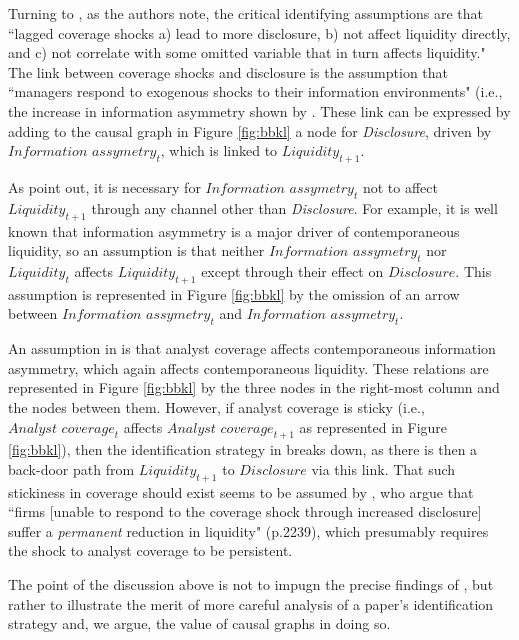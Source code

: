 \documentclass[11pt]{amsart}
\begin{document}
Turning to \citet{Balakrishnan:2014js}, as the authors note, the critical identifying assumptions are that ``lagged coverage shocks a) lead to more disclosure, b) not affect liquidity directly, and c) not correlate with some omitted variable that in turn affects liquidity." 
The link between coverage shocks and disclosure is the assumption that ``managers respond to exogenous shocks to their information environments" (i.e., the increase in information asymmetry shown by  \citet{Kelly:2012ih}.
These link can be expressed by adding to the causal graph in Figure \ref{fig:bbkl} a node for \textit{Disclosure}, driven by $\textit{Information assymetry}_t$, which is linked to $\textit{Liquidity}_{t+1}$.

As \citet{Balakrishnan:2014js} point out, it is necessary for $\textit{Information assymetry}_t$ not to affect $\textit{Liquidity}_{t+1}$ through any channel other than \textit{Disclosure}.
For example, it is well known that information asymmetry is a major driver of contemporaneous liquidity, so an assumption is that neither $\textit{Information assymetry}_t$ nor $\textit{Liquidity}_t$ affects $\textit{Liquidity}_{t+1}$ except through their effect on $\textit{Disclosure}$. 
This assumption is represented in Figure \ref{fig:bbkl} by the omission of an arrow between $\textit{Information assymetry}_t$ and $\textit{Information assymetry}_t$.

An assumption in \citet{Kelly:2012ih} is that analyst coverage affects contemporaneous information asymmetry, which again affects contemporaneous liquidity.
These relations are represented in Figure \ref{fig:bbkl} by the three nodes in the right-most column and the nodes between them.
However, if analyst coverage is sticky (i.e., $\textit{Analyst coverage}_t$ affects $\textit{Analyst coverage}_{t+1}$ as represented in Figure \ref{fig:bbkl}), then the identification strategy in \citet{Balakrishnan:2014js} breaks down, as there is then a back-door path from $\textit{Liquidity}_{t+1}$ to $\textit{Disclosure}$ via this link.
That such stickiness in coverage should exist seems to be assumed by \citet{Balakrishnan:2014js}, who argue that ``firms [unable to respond  to the coverage shock through increased disclosure] suffer a \emph{permanent} reduction in liquidity" (p.2239), which presumably requires the shock to analyst coverage to be persistent.

The point of the discussion above is not to impugn the precise findings of \citet{Balakrishnan:2014js}, but rather to illustrate the merit of more careful analysis of a paper's identification strategy and, we argue, the value of causal graphs in doing so.
\end{document}
